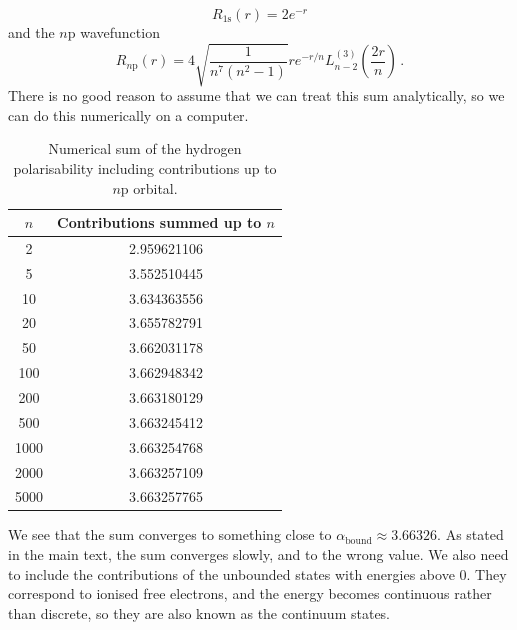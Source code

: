 \documentclass{article}
\theoremstyle{plain}\theoremheaderfont{\normalfont\itshape}\theorembodyfont{\rmfamily}\theoremseparator{.}\newtheorem*{rem}{Remark}\newtheorem*{ex}{Example}\newtheorem*{proof}{Proof}\newtheorem*{altp}{Alternative proof}
\theoremstyle{plain}\theoremheaderfont{\normalfont\bfseries}\theorembodyfont{\rmfamily}\theoremseparator{.}\newtheorem{thm}{Theorem}[section]\newtheorem{lem}[thm]{Lemma}\newtheorem{prop}[thm]{Proposition}\newtheorem*{cor}{Corollary}\newtheorem{defn}[thm]{Definition}\newtheorem{clm}[thm]{Claim}\newtheorem{clminproof}{Claim}
\theoremstyle{break}\theoremheaderfont{\normalfont\itshape}\theorembodyfont{\rmfamily}\theoremseparator{.\medskip}\newtheorem*{proofskip}{Proof}\newtheorem*{exs}{Examples}\newtheorem*{rems}{Remarks}
\theoremstyle{break}\theoremheaderfont{\normalfont\bfseries}\theorembodyfont{\rmfamily}\theoremseparator{.\medskip}\newtheorem{lemskip}[thm]{Lemma}\newtheorem{defnskip}[thm]{Definition}\newtheorem{propskip}[thm]{Proposition}\newtheorem{thmskip}[thm]{Theorem}
\numberwithin{equation}{section}
\begin{document}
    \begin{equation}
        R_{1\mathrm{s}}(r)=2e^{-r}
    \end{equation}
    and the \(n\mathrm{p}\) wavefunction
    \begin{equation}
        R_{n\mathrm{p}}(r)=4\sqrt{\frac{1}{n^7(n^2-1)}}re^{-r/n}L_{n-2}^{(3)}\left(\frac{2r}{n}\right)\,.
    \end{equation}
    There is no good reason to assume that we can treat this sum analytically, so we can do this numerically on a computer.

    \begin{table}
        \centering
        \begin{tabular}{cc}
            \toprule
            \(n\) & Contributions summed up to \(n\) \\ \midrule
            2 & 2.959621106 \\
            5 & 3.552510445 \\
            10 & 3.634363556 \\
            20 & 3.655782791 \\
            50 & 3.662031178 \\
            100 & 3.662948342 \\
            200 & 3.663180129 \\
            500 & 3.663245412 \\
            1000 & 3.663254768 \\
            2000 & 3.663257109 \\
            5000 & 3.663257765 \\ \bottomrule
        \end{tabular}
        \caption{Numerical sum of the hydrogen polarisability including contributions up to \(n\mathrm{p}\) orbital.}
    \end{table}

    We see that the sum converges to something close to \(\alpha_{\text{bound}}\approx 3.66326\). As stated in the main text, the sum converges slowly, and to the wrong value. We also need to include the contributions of the unbounded states with energies above \(0\). They correspond to ionised free electrons, and the energy becomes continuous rather than discrete, so they are also known as the continuum states.
\end{document}
